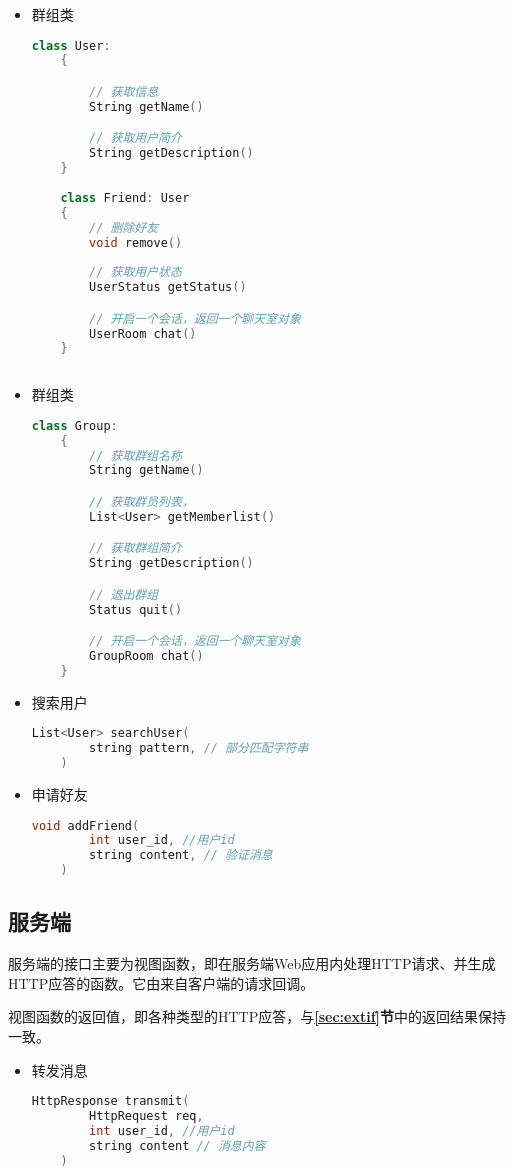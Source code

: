 {\begin{itemize}
    \item 群组类
    \begin{lstlisting}[language=c++]
    class User:
    {

        // 获取信息 
        String getName()

        // 获取用户简介
        String getDescription()
    }
    
    class Friend: User
    {
        // 删除好友
        void remove()
        
        // 获取用户状态
        UserStatus getStatus()

        // 开启一个会话，返回一个聊天室对象
        UserRoom chat()
    }
    
    \end{lstlisting}

    \item 群组类
    \begin{lstlisting}[language=c++]
    class Group:
    {
        // 获取群组名称
        String getName()

        // 获取群员列表，
        List<User> getMemberlist()

        // 获取群组简介
        String getDescription()

        // 退出群组 
        Status quit()

        // 开启一个会话，返回一个聊天室对象
        GroupRoom chat()
    }
    \end{lstlisting}

    \item 搜索用户
    \begin{lstlisting}[language=c++]
    List<User> searchUser(
        string pattern, // 部分匹配字符串
    )
    \end{lstlisting}

    \item 申请好友
    \begin{lstlisting}[language=c++]
    void addFriend(
        int user_id, //用户id
        string content, // 验证消息
    )
    \end{lstlisting}
\end{itemize}

\subsection{服务端}
服务端的接口主要为视图函数，即在服务端Web应用内处理HTTP请求、并生成HTTP应答的函数。它由来自客户端的请求回调。

视图函数的返回值，即各种类型的HTTP应答，与\textbf{\ref{sec:extif}节}中的返回结果保持一致。
\begin{itemize}
    \item 转发消息
    \begin{lstlisting}[language=c++]
    HttpResponse transmit(
        HttpRequest req,
        int user_id, //用户id
        string content // 消息内容
    )
    \end{lstlisting}


\end{itemize}}
